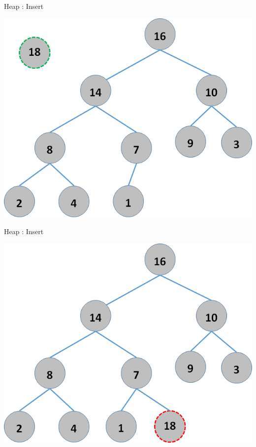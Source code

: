 \documentclass{beamer}
\begin{document}
\begin{frame}{Heap : Insert}
    \begin{center}
        \includegraphics[scale=0.5]{heapInsert1.png}
    \end{center}
\end{frame}


\begin{frame}{Heap : Insert}
    \begin{center}
        \includegraphics[scale=0.5]{heapInsert2.png}
    \end{center}
\end{frame}
\end{document}
